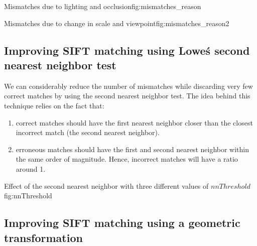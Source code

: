 \documentclass{article}
\begin{document}
          {}
          {Mismatches due to lighting and occlusion}{fig:mismatches_reason}
					
          {}
          {Mismatches due to change in scale and viewpoint}{fig:mismatches_reason2}

\subsection{Improving SIFT matching using Lowe\'s second nearest neighbor test}

We can considerably reduce the number of mismatches while discarding very few correct matches by using the second nearest neighbor test. The idea behind this technique relies on the fact that:

\begin{enumerate}
\item correct matches should have the first nearest neighbor closer than the closest incorrect match (the second nearest neighbor).
\item erroneous matches should have the first and second nearest neighbor within the same order of magnitude. Hence, incorrect matches will have a ratio around 1.
\end{enumerate}

          {}
          {}
          {Effect of the second nearest neighbor with three different values of $nnThreshold$}{fig:nnThreshold}

\subsection{Improving SIFT matching using a geometric transformation}
\end{document}

